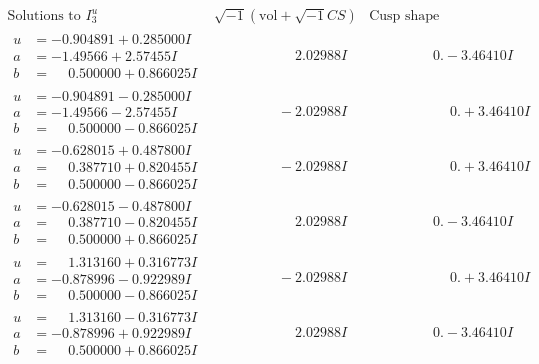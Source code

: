 \documentclass[1p]{elsarticle_modified}
\theoremstyle{definition}
\newcommand{\I}{\sqrt{-1}}
\begin{document}
$$\begin{array}{c|c|c}  
\text{Solutions to }I^u_{3}& \I (\text{vol} + \sqrt{-1}CS) & \text{Cusp shape}\\
 \hline 
\begin{aligned}
u &= -0.904891 + 0.285000 I \\
a &= -1.49566 + 2.57455 I \\
b &= \phantom{-}0.500000 + 0.866025 I\end{aligned}
 & \phantom{-0.000000 -}2.02988 I & \phantom{-0.000000 } 0. - 3.46410 I \\ \hline\begin{aligned}
u &= -0.904891 - 0.285000 I \\
a &= -1.49566 - 2.57455 I \\
b &= \phantom{-}0.500000 - 0.866025 I\end{aligned}
 & \phantom{-0.000000 } -2.02988 I & \phantom{-0.000000 -}0. + 3.46410 I \\ \hline\begin{aligned}
u &= -0.628015 + 0.487800 I \\
a &= \phantom{-}0.387710 + 0.820455 I \\
b &= \phantom{-}0.500000 - 0.866025 I\end{aligned}
 & \phantom{-0.000000 } -2.02988 I & \phantom{-0.000000 -}0. + 3.46410 I \\ \hline\begin{aligned}
u &= -0.628015 - 0.487800 I \\
a &= \phantom{-}0.387710 - 0.820455 I \\
b &= \phantom{-}0.500000 + 0.866025 I\end{aligned}
 & \phantom{-0.000000 -}2.02988 I & \phantom{-0.000000 } 0. - 3.46410 I \\ \hline\begin{aligned}
u &= \phantom{-}1.313160 + 0.316773 I \\
a &= -0.878996 - 0.922989 I \\
b &= \phantom{-}0.500000 - 0.866025 I\end{aligned}
 & \phantom{-0.000000 } -2.02988 I & \phantom{-0.000000 -}0. + 3.46410 I \\ \hline\begin{aligned}
u &= \phantom{-}1.313160 - 0.316773 I \\
a &= -0.878996 + 0.922989 I \\
b &= \phantom{-}0.500000 + 0.866025 I\end{aligned}
 & \phantom{-0.000000 -}2.02988 I & \phantom{-0.000000 } 0. - 3.46410 I \\ \hline\begin{aligned}

\end{aligned}
\end{array}$$
\end{document}
